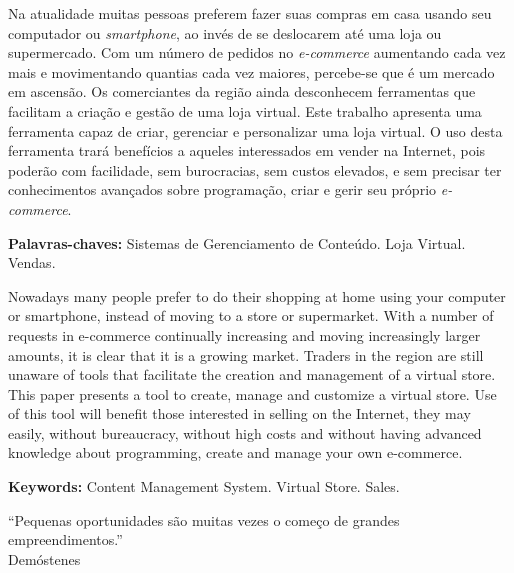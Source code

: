 \documentclass[a4paper,12pt]{monografia}
\begin{document}
\newpage


Na atualidade muitas pessoas preferem fazer suas compras em casa usando seu computador ou \textit{smartphone}, ao invés de se deslocarem até uma loja ou supermercado. Com um número de pedidos no \textit{e-commerce} aumentando cada vez mais e movimentando quantias cada vez maiores, percebe-se que é um mercado em ascensão. Os comerciantes da região ainda desconhecem ferramentas que facilitam a criação e gestão de uma loja virtual. Este trabalho apresenta uma ferramenta capaz de criar, gerenciar e personalizar uma loja virtual. O uso desta ferramenta trará benefícios a aqueles interessados em vender na Internet, pois poderão com facilidade, sem burocracias, sem custos elevados, e sem precisar ter conhecimentos avançados sobre programação, criar e gerir seu próprio \textit{e-commerce}.

\noindent \textbf{Palavras-chaves:} Sistemas de Gerenciamento de Conteúdo. Loja Virtual. Vendas.

Nowadays many people prefer to do their shopping at home using your computer or smartphone, instead of moving to a store or supermarket. With a number of requests in e-commerce continually increasing and moving increasingly larger amounts, it is clear that it is a growing market. Traders in the region are still unaware of tools that facilitate the creation and management of a virtual store. This paper presents a tool to create, manage and customize a virtual store. Use of this tool will benefit those interested in selling on the Internet, they may easily, without bureaucracy, without high costs and without having advanced knowledge about programming, create and manage your own e-commerce.

\noindent \textbf{Keywords:} Content Management System. Virtual Store. Sales.
\newpage

\begin{epigrafe}
“Pequenas oportunidades são muitas vezes o começo de grandes empreendimentos.”\\
\hfill Demóstenes
\end{epigrafe}


{%
\let\oldnumberline\numberline%
\renewcommand{\numberline}{\figurename~\oldnumberline}%
\listoffigures%
\thispagestyle{empty}
}
\end{document}
